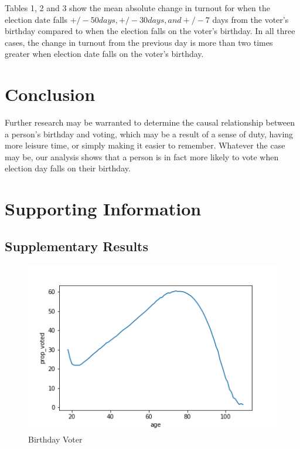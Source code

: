 \documentclass[12pt, letterpaper]{article}
\begin{document}
Tables 1, 2 and 3 show the mean absolute change in turnout for when the election date falls $+/- 50 days,+/-  30 days, and +/- 7$ days from the voter's birthday compared to when the election falls on the voter's birthday. In all three cases, the change in turnout from the previous day is more than two times greater when election date falls on the voter’s birthday.









\section{Conclusion}
Further research may be warranted to determine the causal relationship between a person's birthday and voting, which may be a result of a sense of duty, having more leisure time, or simply making it easier to remember. Whatever the case may be, our analysis shows that a person is in fact more likely to vote when election day falls on their birthday. 

\clearpage

  

\clearpage
\appendix
\renewcommand{\thesection}{SI \arabic{section}}
\renewcommand\thetable{\thesection.\arabic{table}}  
\renewcommand\thefigure{\thesection.\arabic{figure}}

\section{Supporting Information}

\subsection{Supplementary Results}
\begin{figure}[H]
\centering
 \includegraphics[scale=.7]{../figs/fig3_prop_voted_by_age.png}
 \caption{Birthday Voter}
 \label{fig:birthday}
\end{figure}
\end{document}
